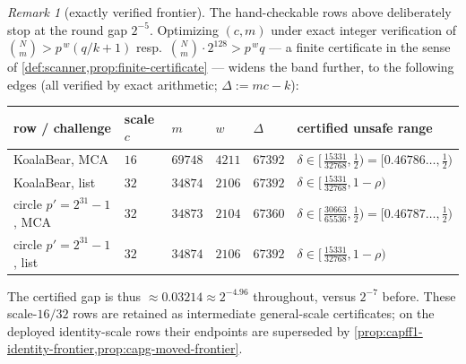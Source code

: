 \documentclass[11pt]{article}
\theoremstyle{definition}
\theoremstyle{remark}
\newtheorem{remark}[remark]{Remark}
\begin{document}
\begin{remark}[exactly verified frontier]\label{rem:exact-frontier}
The hand-checkable rows above deliberately stop at the round gap $2^{-5}$. Optimizing $(c,m)$ under exact integer verification of $\binom{N}{m}>p^{\,w}(q/k+1)$ resp.\ $\binom Nm\cdot2^{128}>p^{\,w}q$ --- a finite certificate in the sense of \cref{def:scanner,prop:finite-certificate} --- widens the band further, to the following edges (all verified by exact arithmetic; $\Delta:=mc-k$):
\begin{center}\footnotesize
\begin{tabular}{@{}llllll@{}}
\toprule
row / challenge & scale $c$ & $m$ & $w$ & $\Delta$ & certified unsafe range \\
\midrule
KoalaBear, MCA & $16$ & $69748$ & $4211$ & $67392$ & $\delta\in[\,\tfrac{15331}{32768},\tfrac12)=[0.46786\ldots,\tfrac12)$ \\
KoalaBear, list & $32$ & $34874$ & $2106$ & $67392$ & $\delta\in[\,\tfrac{15331}{32768},1-\rho)$ \\
circle $p'{=}2^{31}{-}1$, MCA & $32$ & $34873$ & $2104$ & $67360$ & $\delta\in[\,\tfrac{30663}{65536},\tfrac12)=[0.46787\ldots,\tfrac12)$ \\
circle $p'{=}2^{31}{-}1$, list & $32$ & $34874$ & $2106$ & $67392$ & $\delta\in[\,\tfrac{15331}{32768},1-\rho)$ \\
\bottomrule
\end{tabular}
\end{center}
The certified gap is thus $\approx0.03214\approx2^{-4.96}$ throughout, versus $2^{-7}$ before.  These scale-$16/32$ rows are retained as intermediate general-scale certificates; on the deployed identity-scale rows their endpoints are superseded by \cref{prop:capff1-identity-frontier,prop:capg-moved-frontier}.
\end{remark}
\end{document}
